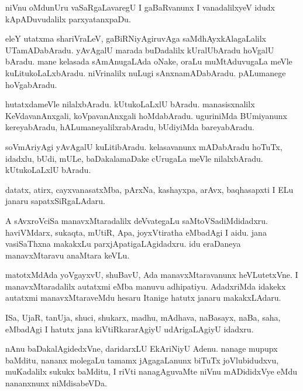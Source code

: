 \documentclass{article}
\begin{document}
\begin{mn}%
niVnu oMdunUru vaSaRgaLavaregU I gaBaRvanunx I vanadalilxyeV idudx
kApADuvudalilx parxyatanxpaDu.
\end{mn}

\begin{mn}%
eleY utatxma shariVraLeV, gaBiRNiyAgiruvAga saMdhAyxkAlagaLalilx
UTamADabAradu. yAvAgalU marada buDadalilx kUralUbAradu hoVgalU
bAradu. mane kelasada sAmAnugaLAda oNake, oraLu muMtAduvugaLa meVle
kuLitukoLaLxbAradu. niVrinalilx nuLugi sAnxnamADabAradu. pALumanege hoVgabAradu.
\end{mn}

\begin{mn}
hutatxdameVle nilalxbAradu. kUtukoLaLxlU bAradu. manasisxnalilx
KeVdavanAnxgali, koVpavanAnxgali hoMdabAradu. uguriniMda BUmiyanunx
kereyabAradu, hALumaneyalilxrabAradu, bUdiyiMda bareyabAradu.
\end{mn}

\begin{mn}
soVmAriyAgi yAvAgalU kuLitibAradu. kelasavanunx mADabAradu hoTuTx,
idadxlu, bUdi, mULe, baDakalamaDake cUrugaLa meVle
nilalxbAradu. kUtukoLaLxlU bAradu.
\end{mn}

\begin{mn}%
datatx, atirx, cayxvanasatxMba, pArxNa, kashayxpa, arAvx, baqhasapxti
I ELu janaru sapatxSiRgaLAdaru.
\end{mn}

\begin{mn}%
A sAvxroVciSa manavxMtaradalilx deVvategaLu
saMtoVSadiMdidadxru. haviVMdarx, sukaqta, mUtiR, Apa, joyxVtiratha
eMbadAgi I aidu. jana vasiSaThxna makakxLu parxjApatigaLAgidadxru. idu
eraDaneya manavxMtaravu anaMtara keVLu.
\end{mn}

\begin{mn}
matotxMdAda yoVgayxvU, shuBavU, Ada manavxMtaravanunx heVLutetxVne. I
manavxMtaradalilx autatxmi eMba manuvu adhipatiyu. AdadxriMda idakekx
autatxmi manavxMtaraveMdu hesaru Itanige hatutx janaru makakxLAdaru.
\end{mn}

\begin{mn}
ISa, UjaR, tanUja, shuci, shukarx, madhu, mAdhava, naBasayx, naBa,
saha, eMbadAgi I hatutx jana kiVtiRkararAgiyU udArigaLAgiyU idadxru.
\end{mn}

\begin{mn}%
nAnu baDakalAgidedxVne, daridarxLU EkAriNiyU Adenu. nanage mupupx
baMditu, nananx molegaLu tamamx jAgagaLanunx biTuTx joVlubidudxvu,
muKadalilx sukukx baMditu, I riVti nanagAguvaMte niVnu mADididxVye
eMdu nananxnunx niMdisabeVDa.
\end{mn}
\end{document}
